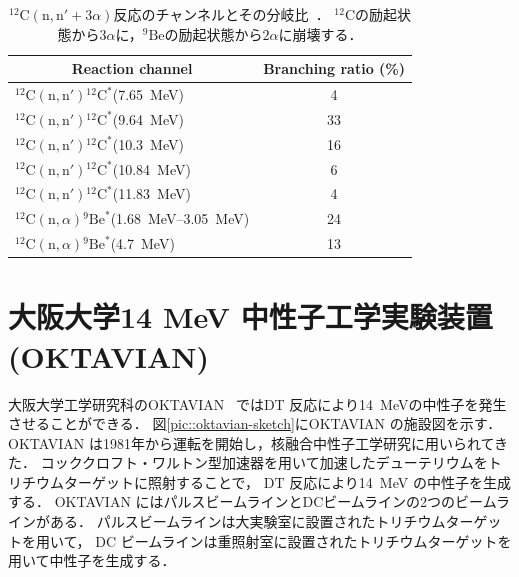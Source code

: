 \documentclass[../master]{subfiles}
\begin{document}
\begin{table}
  \centering
  \caption[${}^{12}\mathrm{C}(\mathrm{n},\mathrm{n}'+3\alpha)$反応のチャンネルとその分岐比．]
          {${}^{12}\mathrm{C}(\mathrm{n},\mathrm{n}'+3\alpha)$反応のチャンネルとその分岐比~\cite{kondoetal}．
            ${}^{12}\mathrm{C}$の励起状態から$3\alpha$に，${}^{9}\mathrm{Be}$の励起状態から$2\alpha$に崩壊する．}
  \label{tab::branchingratio}
  \begin{tabular}{lc}
    \toprule
    \multicolumn{1}{c}{Reaction channel} & Branching ratio (\%)\\
    \midrule
    ${}^{12}\mathrm{C}(\mathrm{n},\mathrm{n}'){}^{12}\mathrm{C}^{*}$(\SI{7.65}{\mega\electronvolt}) & 4\\
    ${}^{12}\mathrm{C}(\mathrm{n},\mathrm{n}'){}^{12}\mathrm{C}^{*}$(\SI{9.64}{\mega\electronvolt}) & 33\\
    ${}^{12}\mathrm{C}(\mathrm{n},\mathrm{n}'){}^{12}\mathrm{C}^{*}$(\SI{10.3}{\mega\electronvolt}) & 16\\
    ${}^{12}\mathrm{C}(\mathrm{n},\mathrm{n}'){}^{12}\mathrm{C}^{*}$(\SI{10.84}{\mega\electronvolt}) & 6\\
    ${}^{12}\mathrm{C}(\mathrm{n},\mathrm{n}'){}^{12}\mathrm{C}^{*}$(\SI{11.83}{\mega\electronvolt}) & 4\\
    ${}^{12}\mathrm{C}(\mathrm{n},\alpha){}^{9}\mathrm{Be}^{*}$(\SIrange{1.68}{3.05}{\mega\electronvolt}) & 24\\
    ${}^{12}\mathrm{C}(\mathrm{n},\alpha){}^{9}\mathrm{Be}^{*}$(\SI{4.7}{\mega\electronvolt}) & 13\\
    \bottomrule
  \end{tabular}
\end{table}

\section{大阪大学14 MeV 中性子工学実験装置 (OKTAVIAN)}
大阪大学工学研究科のOKTAVIAN~\cite{oktavian} ではDT 反応により\SI{14}{\mega\electronvolt}の中性子を発生させることができる．
図\ref{pic::oktavian-sketch}にOKTAVIAN の施設図を示す．
OKTAVIAN は1981年から運転を開始し，核融合中性子工学研究に用いられてきた．
コッククロフト・ワルトン型加速器を用いて加速したデューテリウムをトリチウムターゲットに照射することで，
DT 反応により\SI{14}{\mega\electronvolt} の中性子を生成する．
OKTAVIAN にはパルスビームラインとDCビームラインの2つのビームラインがある．
パルスビームラインは大実験室に設置されたトリチウムターゲットを用いて，
DC ビームラインは重照射室に設置されたトリチウムターゲットを用いて中性子を生成する．
\end{document}
